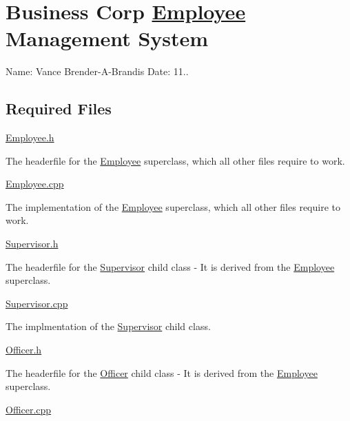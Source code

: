 \section*{Business Corp \hyperlink{classEmployee}{Employee} Management System}

Name\+: Vance Brender-\/\+A-\/\+Brandis Date\+: 11..

\subsection*{Required Files}


\begin{DoxyItemize}
\item \hyperlink{Employee_8h}{Employee.\+h}
\begin{DoxyItemize}
\item The headerfile for the \hyperlink{classEmployee}{Employee} superclass, which all other files require to work.
\end{DoxyItemize}
\item \hyperlink{Employee_8cpp}{Employee.\+cpp}
\begin{DoxyItemize}
\item The implementation of the \hyperlink{classEmployee}{Employee} superclass, which all other files require to work.
\end{DoxyItemize}
\item \hyperlink{Supervisor_8h}{Supervisor.\+h}
\begin{DoxyItemize}
\item The headerfile for the \hyperlink{classSupervisor}{Supervisor} child class -\/ It is derived from the \hyperlink{classEmployee}{Employee} superclass.
\end{DoxyItemize}
\item \hyperlink{Supervisor_8cpp}{Supervisor.\+cpp}
\begin{DoxyItemize}
\item The implmentation of the \hyperlink{classSupervisor}{Supervisor} child class.
\end{DoxyItemize}
\item \hyperlink{Officer_8h}{Officer.\+h}
\begin{DoxyItemize}
\item The headerfile for the \hyperlink{classOfficer}{Officer} child class -\/ It is derived from the \hyperlink{classEmployee}{Employee} superclass.
\end{DoxyItemize}
\item \hyperlink{Officer_8cpp}{Officer.\+cpp}

\end{DoxyItemize}
